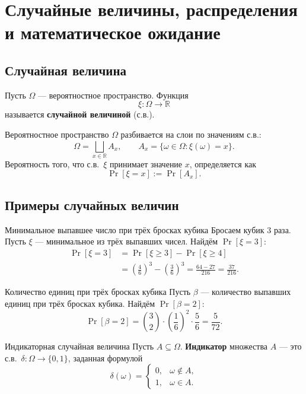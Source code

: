 
\section{Случайные величины, распределения и математическое ожидание}

\subsection{Случайная величина}

\begin{Definition}{}{}
	Пусть $\Omega$ — вероятностное пространство. Функция
	\[
	\xi \colon \Omega \to \mathbb{R}
	\]
	называется \textbf{случайной величиной} (с.в.).
\end{Definition}

Вероятностное пространство $\Omega$ разбивается на слои по значениям с.в.:
\[
\Omega = \bigsqcup_{x \in \mathbb{R}} A_x, \qquad A_x = \{\omega \in \Omega : \xi(\omega) = x\}.
\]
Вероятность того, что с.в.\ $\xi$ принимает значение $x$, определяется как
\[
\Pr[\xi = x] := \Pr[A_x].
\]

\subsection{Примеры случайных величин}

\begin{Example}{Минимальное выпавшее число при трёх бросках кубика}{}
	Бросаем кубик $3$ раза. Пусть $\xi$ — минимальное из трёх выпавших чисел. Найдём $\Pr[\xi = 3]$:
	\begin{align*}
		\Pr[\xi = 3] &= \Pr[\xi \geq 3] - \Pr[\xi \geq 4] \\
		&= \left(\frac{4}{6}\right)^3 - \left(\frac{3}{6}\right)^3
		= \frac{64 - 27}{216} = \frac{37}{216}.
	\end{align*}
\end{Example}

\begin{Example}{Количество единиц при трёх бросках кубика}{}
	Пусть $\beta$ — количество выпавших единиц при трёх бросках кубика. Найдём $\Pr[\beta = 2]$:
	\[
	\Pr[\beta = 2] = \binom{3}{2} \cdot \left(\frac{1}{6}\right)^2 \cdot \frac{5}{6} = \frac{5}{72}.
	\]
\end{Example}

\begin{Example}{Индикаторная случайная величина}{}
	Пусть $A \subseteq \Omega$. \textbf{Индикатор} множества $A$ — это с.в.\ $\delta \colon \Omega \to \{0,1\}$, заданная формулой
	\[
	\delta(\omega) = \begin{cases} 0, & \omega \notin A, \\ 1, & \omega \in A. \end{cases}
	\]
\end{Example}

